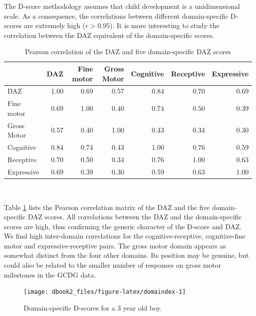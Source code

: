 \documentclass[
]{book}
\begin{document}
The D-score methodology assumes that child development is a unidimensional scale. As a consequence, the correlations between different domain-specific D-scores are extremely high (\(r > 0.95\)). It is more interesting to study the correlation between the DAZ equivalent of the domain-specific scores.

\begin{table}

\caption{\label{tab:domaincor}Pearson correlation of the DAZ and five domain-specific DAZ scores}
\centering
\begin{tabular}[t]{l|r|r|r|r|r|r}
\hline
  & DAZ & Fine motor & Gross Motor & Cognitive & Receptive & Expressive\\
\hline
DAZ & 1.00 & 0.69 & 0.57 & 0.84 & 0.70 & 0.69\\
\hline
Fine motor & 0.69 & 1.00 & 0.40 & 0.74 & 0.50 & 0.39\\
\hline
Gross Motor & 0.57 & 0.40 & 1.00 & 0.43 & 0.34 & 0.30\\
\hline
Cognitive & 0.84 & 0.74 & 0.43 & 1.00 & 0.76 & 0.59\\
\hline
Receptive & 0.70 & 0.50 & 0.34 & 0.76 & 1.00 & 0.63\\
\hline
Expressive & 0.69 & 0.39 & 0.30 & 0.59 & 0.63 & 1.00\\
\hline
\end{tabular}
\end{table}

~

Table \ref{tab:domaincor} lists the Pearson correlation matrix of the DAZ and the five domain-specific DAZ scores. All correlations between the DAZ and the domain-specific scores are high, thus confirming the generic character of the D-score and DAZ. We find high inter-domain correlations for the cognitive-receptive, cognitive-fine motor and expressive-receptive pairs. The gross motor domain appears as somewhat distinct from the four other domains. Its position may be genuine, but could also be related to the smaller number of responses on gross motor milestones in the GCDG data.

\begin{figure}

{\centering \texttt{[image: dbook2\_files/figure-latex/domaindex-1]} 

}

\caption{Domain-specific D-scores for a 3 year old boy.}\label{fig:domaindex}
\end{figure}
\end{document}
